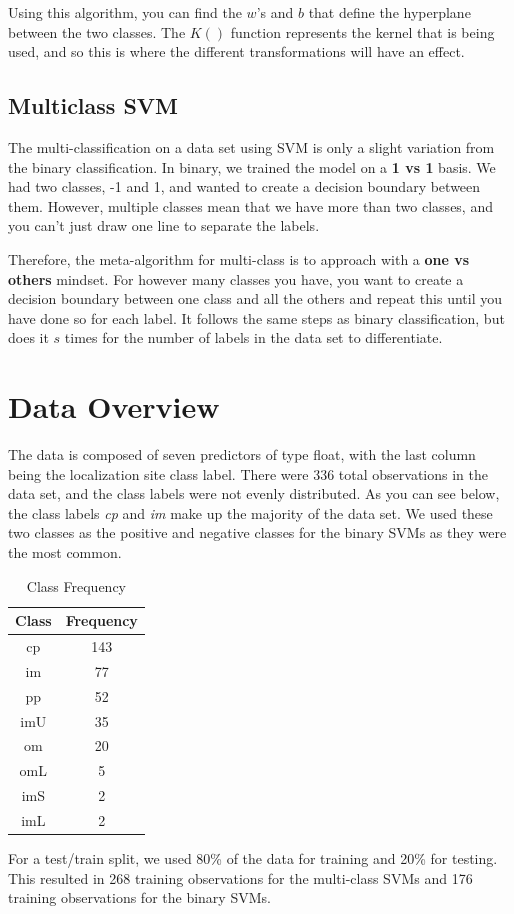 \documentclass[12pt]{article}
\begin{document}
Using this algorithm, you can find the $w$'s and $b$ that define the hyperplane between the two classes. The $K()$ function represents the kernel that is being used, and so this is where the different transformations will have an effect. 

\subsection{Multiclass SVM}
The multi-classification on a data set using SVM is only a slight variation from the binary classification. In binary, we trained the model on a \textbf{1 vs 1} basis. We had two classes, -1 and 1, and wanted to create a decision boundary between them. However, multiple classes mean that we have more than two classes, and you can't just draw one line to separate the labels.

Therefore, the meta-algorithm for multi-class is to approach with a \textbf{one vs others} mindset. For however many classes you have, you want to create a decision boundary between one class and all the others and repeat this until you have done so for each label. It follows the same steps as binary classification, but does it $s$ times for the number of labels in the data set to differentiate. 
\section{Data Overview}
The data is composed of seven predictors of type float, with the last column being the localization site class label.
There were 336 total observations in the data set, and the class labels were not evenly distributed.
As you can see below, the class labels \textit{cp} and \textit{im} make up the majority of the data set.
We used these two classes as the positive and negative classes for the binary SVMs as they were the most common.
\begin{table}[h]
    \centering
    \caption{Class Frequency}
    \label{tab:class_frequency}
    \begin{tabular}{cc}
        \toprule
        \textbf{Class} & \textbf{Frequency} \\
        \midrule
        cp & 143 \\
        im & 77 \\
        pp & 52 \\
        imU & 35 \\
        om & 20 \\
        omL & 5 \\
        imS & 2 \\
        imL & 2 \\
        \bottomrule
    \end{tabular}
\end{table}
For a test/train split, we used 80\% of the data for training and 20\% for testing.
This resulted in 268 training observations for the multi-class SVMs and 176 training observations for the binary SVMs.
\end{document}
